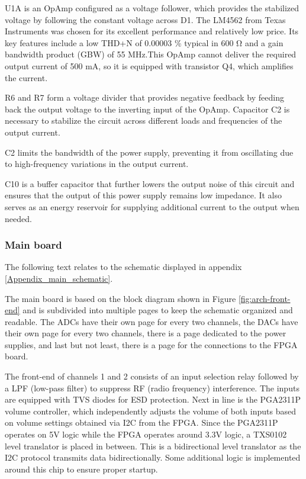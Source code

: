 U1A is an OpAmp configured as a voltage follower, which provides the stabilized voltage by following the constant voltage across D1. The LM4562 from Texas Instruments was chosen for its excellent performance and relatively low price. Its key features include a low THD+N of 0.00003 \% typical in 600 Ω and a gain bandwidth product (GBW) of 55 MHz.This OpAmp cannot deliver the required output current of 500 mA, so it is equipped with transistor Q4, which amplifies the current.

R6 and R7 form a voltage divider that provides negative feedback by feeding back the output voltage to the inverting input of the OpAmp. Capacitor C2 is necessary to stabilize the circuit across different loads and frequencies of the output current.

C2 limits the bandwidth of the power supply, preventing it from oscillating due to high-frequency variations in the output current.

C10 is a buffer capacitor that further lowers the output noise of this circuit and ensures that the output of this power supply remains low impedance. It also serves as an energy reservoir for supplying additional current to the output when needed.

\subsubsection{Main board}
The following text relates to the schematic displayed in appendix \ref{Appendix_main_schematic}.

The main board is based on the block diagram shown in Figure \ref{fig:arch-front-end} and is subdivided into multiple pages to keep the schematic organized and readable. The ADCs have their own page for every two channels, the DACs have their own page for every two channels, there is a page dedicated to the power supplies, and last but not least, there is a page for the connections to the FPGA board.

The front-end of channels 1 and 2 consists of an input selection relay followed by a LPF (low-pass filter) to suppress RF (radio frequency) interference. The inputs are equipped with TVS diodes for ESD protection. Next in line is the PGA2311P volume controller, which independently adjusts the volume of both inputs based on volume settings obtained via I2C from the FPGA. Since the PGA2311P operates on 5V logic while the FPGA operates around 3.3V logic, a TXS0102 level translator is placed in between. This is a bidirectional level translator as the I2C protocol transmits data bidirectionally. Some additional logic is implemented around this chip to ensure proper startup.

